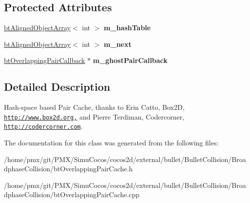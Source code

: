 \subsection*{Protected Attributes}
\begin{DoxyCompactItemize}
\item 
\mbox{\label{classbtHashedOverlappingPairCache_a57b2ac6d1baaf40af1f38186b5a6a7b3}} 
\hyperlink{classbtAlignedObjectArray}{bt\+Aligned\+Object\+Array}$<$ int $>$ {\bfseries m\+\_\+hash\+Table}
\item 
\mbox{\label{classbtHashedOverlappingPairCache_a908cea7cc29b38ffe5f94f6e11e1b7c3}} 
\hyperlink{classbtAlignedObjectArray}{bt\+Aligned\+Object\+Array}$<$ int $>$ {\bfseries m\+\_\+next}
\item 
\mbox{\label{classbtHashedOverlappingPairCache_a480da331f36d8d529702c697867939a6}} 
\hyperlink{classbtOverlappingPairCallback}{bt\+Overlapping\+Pair\+Callback} $\ast$ {\bfseries m\+\_\+ghost\+Pair\+Callback}
\end{DoxyCompactItemize}


\subsection{Detailed Description}
Hash-\/space based Pair Cache, thanks to Erin Catto, Box2D, \href{http://www.box2d.org,}{\tt http\+://www.\+box2d.\+org,} and Pierre Terdiman, Codercorner, \href{http://codercorner.com}{\tt http\+://codercorner.\+com}. 

The documentation for this class was generated from the following files\+:\begin{DoxyCompactItemize}
\item 
/home/pmx/git/\+P\+M\+X/\+Simu\+Cocos/cocos2d/external/bullet/\+Bullet\+Collision/\+Broadphase\+Collision/bt\+Overlapping\+Pair\+Cache.\+h\item 
/home/pmx/git/\+P\+M\+X/\+Simu\+Cocos/cocos2d/external/bullet/\+Bullet\+Collision/\+Broadphase\+Collision/bt\+Overlapping\+Pair\+Cache.\+cpp\end{DoxyCompactItemize}
